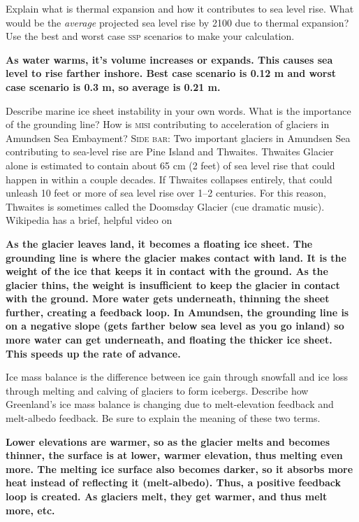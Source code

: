 \documentclass[12pt, addpoints]{exam}
\begin{document}
\begin{questions}
\question[5]
Explain what is thermal expansion and how it contributes to sea level 
rise. What would be the \emph{average} projected sea level rise by 2100 
due to thermal expansion? Use the best and worst case \textsc{ssp} 
scenarios to make your calculation.


\ifprintanswers\textbf{%
As water warms, it's volume increases or expands. This causes sea level 
to rise farther inshore. Best case scenario is 0.12 m and worst case
scenario is 0.3 m, so average is 0.21 m.
}\fi

\question[10]
Describe marine ice sheet instability in your own words. What is the 
importance of the grounding line? How is \textsc{misi} contributing
to acceleration of glaciers in Amundsen Sea Embayment? \textsc{Side bar:}
Two important glaciers in Amundsen Sea contributing to sea-level rise
are Pine Island and Thwaites. Thwaites Glacier alone is estimated to
contain about 65 cm (2 feet) of sea level rise that could happen in
within a couple decades. If Thwaites collapses entirely, that could
unleash 10 feet or more of sea level rise over 1–2 centuries. For this
reason, Thwaites is sometimes called the Doomsday Glacier (cue dramatic 
music). Wikipedia has a brief, helpful video on 


\ifprintanswers\textbf{%
As the glacier leaves land, it becomes a floating ice sheet. The 
grounding line is where the glacier makes contact with land. It is
the weight of the ice that keeps it in contact with the ground. As the 
glacier thins, the weight is insufficient to keep the glacier in contact 
with the ground. More water gets underneath, thinning the sheet further,
creating a feedback loop. In Amundsen, the grounding line is on a 
negative slope (gets farther below sea level as you go inland) so more 
water can get underneath, and floating the thicker ice sheet. This 
speeds up the rate of advance.
}\fi

\question[5]
Ice mass balance is the difference between ice gain through snowfall and 
ice loss through melting and calving of glaciers to form icebergs. 
Describe how Greenland's ice mass balance is changing due to 
melt-elevation feedback and melt-albedo feedback. Be sure to explain
the meaning of these two terms.

\ifprintanswers\textbf{%
Lower elevations are warmer, so as the glacier melts and becomes 
thinner, the surface is at lower, warmer elevation, thus melting even
more. The melting ice surface also becomes darker, so it absorbs more
heat instead of reflecting it (melt-albedo). Thus, a positive feedback
loop is created. As glaciers melt, they get warmer, and thus melt more, 
etc.
}\fi



\end{questions}
\end{document}
